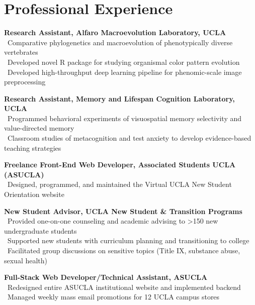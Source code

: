 \section*{Professional Experience}
\textbf{Research Assistant, Alfaro Macroevolution Laboratory, UCLA}\\
\textendash\ Comparative phylogenetics and macroevolution of phenotypically diverse vertebrates\\
\textendash\ Developed novel R package for studying organismal color pattern evolution\\
\textendash\ Developed high-throughput deep learning pipeline for phenomic-scale image preprocessing

\pubspace

\textbf{Research Assistant, Memory and Lifespan Cognition Laboratory, UCLA}\\
\textendash\ Programmed behavioral experiments of visuospatial memory selectivity and value-directed memory\\
\textendash\ Classroom studies of metacognition and test anxiety to develop evidence-based teaching strategies

\pubspace

\textbf{Freelance Front-End Web Developer, Associated Students UCLA (ASUCLA)}\\
\textendash\ Designed, programmed, and maintained the Virtual UCLA New Student Orientation website

\pubspace

\textbf{New Student Advisor, UCLA New Student \& Transition Programs}\\
\textendash\ Provided one-on-one counseling and academic advising to >150 new undergraduate students\\
\textendash\ Supported new students with curriculum planning and transitioning to college\\
\textendash\ Facilitated group discussions on sensitive topics (Title IX, substance abuse, sexual health)

\pubspace

\textbf{Full-Stack Web Developer/Technical Assistant, ASUCLA}\\
\textendash\ Redesigned entire ASUCLA institutional website and implemented backend\\
\textendash\ Managed weekly mass email promotions for 12 UCLA campus stores

\pubspace

